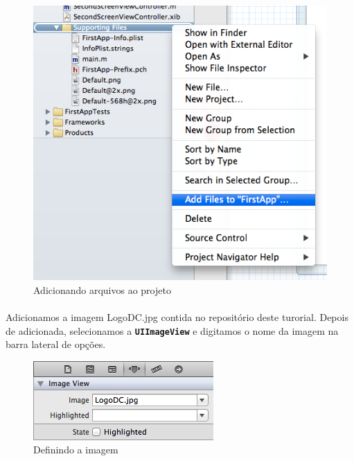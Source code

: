 \documentclass[a4paper,12pt,brazil,doubleside]{book}
\begin{document}
\begin{singlespace}
\begin{figure}[H]
  \centering
  \includegraphics[totalheight=0.4\textheight]{figuras/2/add_files.png}
  \caption{Adicionando arquivos ao projeto}
  \label{fig:a}
\end{figure}

\bigskip

\paragraph{}Adicionamos a imagem LogoDC.jpg contida no repositório deste turorial. Depois de adicionada, selecionamos a \texttt{\textbf{UIImageView}} e digitamos o nome da imagem na barra lateral de opções.

\bigskip
\bigskip

\begin{figure}[H]
  \centering
  \includegraphics[totalheight=0.12\textheight]{figuras/2/image_path.png}
  \caption{Definindo a imagem}
  \label{fig:a}
\end{figure}

\bigskip


\end{singlespace}
\end{document}
